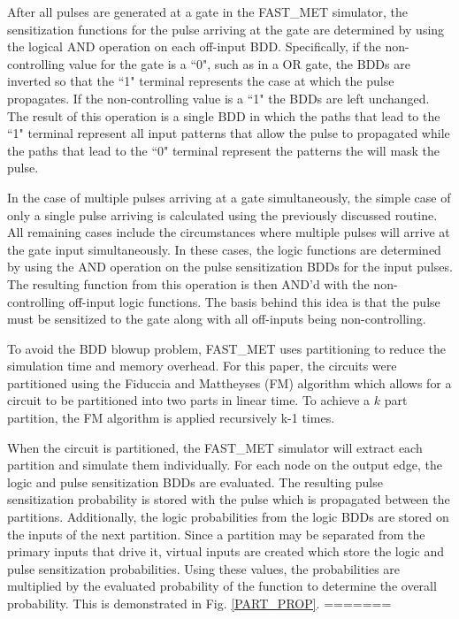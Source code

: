 \documentclass[conference]{IEEEtran}
\begin{document}
After all pulses are generated at a gate in the FAST\_MET simulator, the sensitization functions for the pulse arriving at the gate are determined by using the logical AND operation on each off-input BDD. Specifically, if the non-controlling value for the gate is a ``0", such as in a OR gate, the BDDs are inverted so that the ``1" terminal represents the case at which the pulse propagates. If the non-controlling value is a ``1" the BDDs are left unchanged. The result of this operation is a single BDD in which the paths that lead to the ``1" terminal represent all input patterns that allow the pulse to propagated while the paths that lead to the ``0" terminal represent the patterns the will mask the pulse.

In the case of multiple pulses arriving at a gate simultaneously, the simple case of only a single pulse arriving is calculated using the previously discussed routine. All remaining cases include the circumstances where multiple pulses will arrive at the gate input simultaneously. In these cases, the logic functions are determined by using the AND operation on the pulse sensitization BDDs for the input pulses. The resulting function from this operation is then AND'd with the non-controlling off-input logic functions. The basis behind this idea is that the pulse must be sensitized to the gate along with all off-inputs being non-controlling.

To avoid the BDD blowup problem, FAST\_MET uses partitioning to reduce the simulation time and memory overhead. For this paper, the circuits were partitioned using the Fiduccia and Mattheyses (FM) algorithm \cite{Fiduccia1982} which allows for a circuit to be partitioned into two parts in linear time. To achieve a $k$ part partition, the FM algorithm is applied recursively k-1 times. 

When the circuit is partitioned, the FAST\_MET simulator will extract each partition and simulate them individually. For each node on the output edge, the logic and pulse sensitization BDDs are evaluated. The resulting pulse sensitization probability is stored with the pulse which is propagated between the partitions. Additionally, the logic probabilities from the logic BDDs are stored on the inputs of the next partition. Since a partition may be separated from the primary inputs that drive it, virtual inputs are created which store the logic and pulse sensitization probabilities. Using these values, the probabilities are multiplied by the evaluated probability of the function to determine the overall probability. This is demonstrated in Fig. \ref{PART_PROP}.
=======
\normalsize
\end{document}
